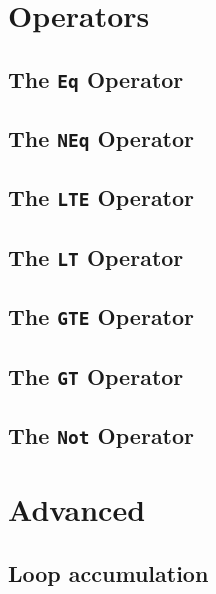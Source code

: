\section{Operators}
    \subsection{The \texttt{Eq} Operator}
    
    \subsection{The \texttt{NEq} Operator}
    
    \subsection{The \texttt{LTE} Operator}
    
    \subsection{The \texttt{LT} Operator}
    
    \subsection{The \texttt{GTE} Operator}
    
    \subsection{The \texttt{GT} Operator}
    
    \subsection{The \texttt{Not} Operator}

\section{Advanced}
    \subsection{Loop accumulation}
